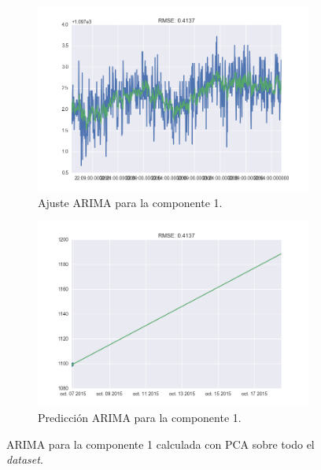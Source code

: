 \documentclass[11pt,spanish,listoffigures,listoftables]{tfgetsinf}
\begin{document}
        \begin{figure}[H]
            \centering
            \begin{subfigure}[h]{0.49\textwidth}
                \centering
                \includegraphics[width=\textwidth]{arima_c1_all_dataset.png}
                \caption{Ajuste ARIMA para la componente 1.}
                \label{fig:arima_c1_all_dataset_fit}
            \end{subfigure}
            \begin{subfigure}[h]{0.49\textwidth}
                \centering
                \includegraphics[width=\textwidth]{arima_c1_all_dataset_pred.png}
                \caption{Predicción ARIMA para la componente 1.}
                \label{fig:arima_c1_all_dataset_pred}
            \end{subfigure}
            \caption{ARIMA para la componente 1 calculada con PCA sobre todo el {\em dataset}.}
            \label{fig:arima_c1_all_dataset}
        \end{figure}
\end{document}

